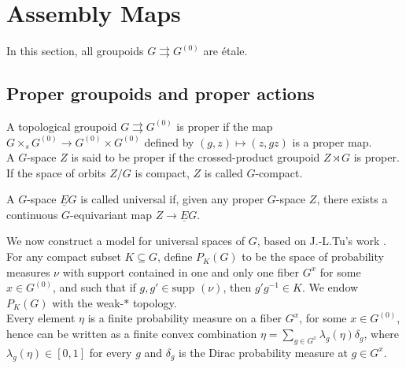 \section{Assembly Maps}

In this section, all groupoids $G\rightrightarrows G^{(0)}$ are étale. 

\subsection{Proper groupoids and proper actions}

\begin{definition}
A topological groupoid $G\rightrightarrows G^{(0)}$ is proper if the map $G\times_s G^{(0)}\rightarrow G^{(0)}\times G^{(0)}$ defined by $(g,z)\mapsto (z,gz)$ is a proper map.\\
A $G$-space $Z$ is said to be proper if the crossed-product groupoid $Z\rtimes G$ is proper. If the space of orbits $Z/G$ is compact, $Z$ is called $G$-compact.
\end{definition}

\begin{definition}
A $G$-space $\underline E G$ is called universal if, given any proper $G$-space $Z$, there exists a continuous $G$-equivariant map $Z\rightarrow \underline E G$.
\end{definition}

We now construct a model for universal spaces of $G$, based on J.-L.Tu's work \cite{TuBC2}. For any compact subset $K\subseteq G$, define $P_K(G)$ to be the space of probability measures $\nu $ with support contained in one and only one fiber $G^x$ for some $x\in G^{(0)}$, and such that if $g,g'\in \text{supp }(\nu)$, then $g'g^{-1}\in K$. We endow $P_K(G)$ with the weak-$*$ topology.\\

Every element $\eta$ is a finite probability measure on a fiber $G^x$, for some $x\in G^{(0)}$, hence can be written as a finite convex combination $\eta = \sum_{g\in G^{x}}\lambda_g(\eta)\delta_g$, where $\lambda_g(\eta)\in [0,1]$ for every $g$ and $\delta_g$ is the Dirac probability measure at $g\in G^x$.\\ 

